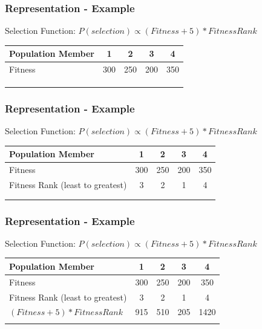 \documentclass{beamer}
\begin{document}
	\begin{frame}
		\frametitle{Representation - Example}
		Selection Function: $P(selection) \propto (Fitness + 5) * FitnessRank$
		\begin{table}
			\begin{tabular}{ m{5cm} | c | c | c | c }
				Population Member & 1 & 2 & 3 & 4  \\
				\hline
				Fitness & 300 & 250 & 200 & 350  \\
				& & & & \\ 
				& & & & \\ 
				& & & & \\ 
			\end{tabular}
		\end{table}		
	\end{frame} 

	\begin{frame}
		\frametitle{Representation - Example}
		Selection Function: $P(selection) \propto (Fitness + 5) * FitnessRank$
		\begin{table}
			\begin{tabular}{ m{5cm} | c | c | c | c }
				Population Member & 1 & 2 & 3 & 4  \\
				\hline 
				Fitness & 300 & 250 & 200 & 350  \\
				Fitness Rank (least to greatest) & 3 & 2 & 1 & 4  \\
				& & & & \\ 
				& & & & \\ 
			\end{tabular}
		\end{table}		
	\end{frame}
	 
	\begin{frame}
		\frametitle{Representation - Example}
		Selection Function: $P(selection) \propto (Fitness + 5) * FitnessRank$
		\begin{table}
			\begin{tabular}{ m{5cm} | c | c | c | c }
				Population Member & 1 & 2 & 3 & 4  \\
				\hline 
				Fitness & 300 & 250 & 200 & 350  \\
				Fitness Rank (least to greatest) & 3 & 2 & 1 & 4  \\
				$(Fitness + 5) * FitnessRank$ & 915 & 510 & 205 & 1420  \\
				& & & & \\ 
			\end{tabular}
		\end{table}		
	\end{frame}
	 
\end{document}

